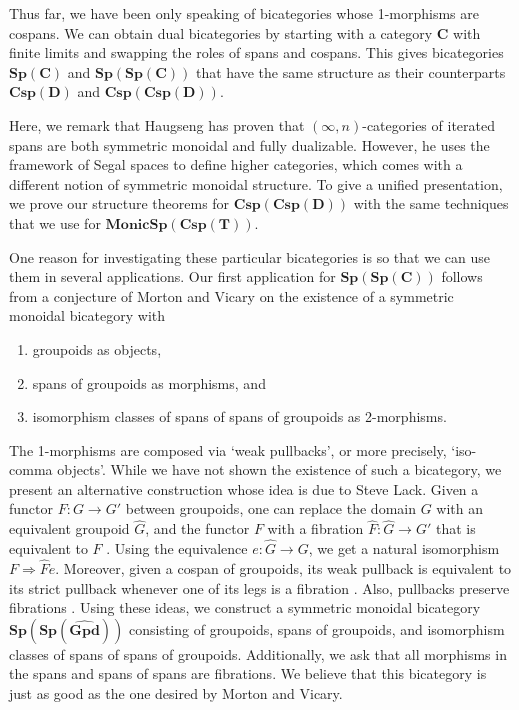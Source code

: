 \documentclass[11pt]{amsart}
\newcommand{\cat}[1]{\mathbf{#1}}
\newcommand{\bispmap}[1]{\mathbf{Sp(#1)}}
\newcommand{\bicspmap}[1]{\mathbf{Csp(#1)}}
\newcommand{\bispsp}[1]{\mathbf{Sp(Sp(#1))}}
\newcommand{\bicspcsp}[1]{\mathbf{Csp(Csp(#1))}}
\newcommand{\bimonspcsp}[1]{\mathbf{MonicSp(Csp(#1))}}
\theoremstyle{remark}
\theoremstyle{definition}
\begin{document}
Thus far, we have been only speaking of bicategories 
whose 1-morphisms are cospans. 
We can obtain dual bicategories by starting 
with a category $\cat{C}$ with finite limits 
and swapping the roles of spans and cospans.
This gives bicategories $\bispmap{C}$ and $\bispsp{C}$ 
that have the same structure as their counterparts 
$\bicspmap{D}$ and $\bicspcsp{D}$.

Here, we remark that Haugseng \cite{Haug} 
has proven that $(\infty,n)$-categories of iterated spans
are both symmetric monoidal and fully dualizable.
However, he uses the framework of Segal spaces to
define higher categories, which comes with a different 
notion of symmetric monoidal structure.
To give a unified presentation,
we prove our structure theorems for $\bicspcsp{D}$ with
the same techniques that we use for $\bimonspcsp{T}$.

One reason for investigating these particular bicategories is so that we can use them in several applications.
Our first application for $\bispsp{C}$ follows from a conjecture of
Morton and Vicary 
	\cite{MortVic} 
on the existence of a symmetric monoidal bicategory with
\begin{enumerate}
	\item{groupoids as objects,}
	\item{spans of groupoids as morphisms, and}
	\item{isomorphism classes of spans of spans of groupoids as 2-morphisms.}
\end{enumerate}
The 1-morphisms are composed via `weak pullbacks', 
or more precisely, `iso-comma objects'.
While we have not shown the existence of such a bicategory, 
we present an alternative construction whose idea is due to Steve Lack. 
Given a functor 
	$F \colon G \to G'$ 
between groupoids, 
one can replace the domain $G$ 
with an equivalent groupoid $\hat{G}$, 
and the functor $F$ with a fibration 
	$\hat{F} \colon \hat{G} \to G'$ 
that is equivalent to $F$
	\cite{Anderson,Bousfield,Strickland}. 
Using the equivalence 
	$e \colon \hat{G} \to G$, 
we get a natural isomorphism 
	$F \Rightarrow \hat{F} e$. 
Moreover, given a cospan of groupoids, its 
weak pullback is equivalent to its strict pullback
whenever one of its legs is a fibration 
	\cite{JoyalStreet1}. 
Also, pullbacks preserve fibrations
	\cite{Brown,Heath}. 
Using these ideas,
we construct a symmetric monoidal bicategory 
	$\cat{Sp(Sp(\widehat{Gpd}))}$ 
consisting of groupoids, 
spans of groupoids, 
and isomorphism classes of spans of spans of groupoids. 
Additionally, we ask that all morphisms 
in the spans and spans of spans are fibrations.
We believe that this bicategory 
is just as good as the one desired by Morton and Vicary.
\end{document}
